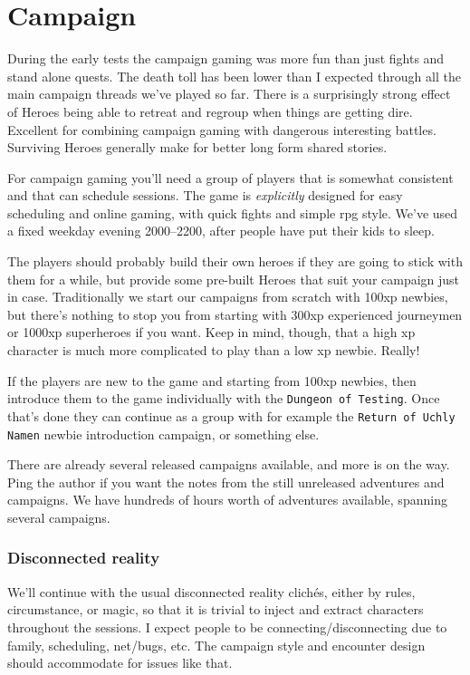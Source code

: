 

\cleardoublepage

\chapter*{Campaign}


During the early tests the campaign gaming was more fun than just fights and stand alone quests. The death toll has been lower than I expected through all the main campaign threads we've played so far. There is a surprisingly strong effect of Heroes being able to retreat and regroup when things are getting dire. Excellent for combining campaign gaming with dangerous interesting battles. Surviving Heroes generally make for better long form shared stories. 

For campaign gaming you'll need a group of players that is somewhat consistent and that can schedule sessions. The game is \emph{explicitly} designed for easy scheduling and online gaming, with quick fights and simple rpg style. We've used a fixed weekday evening 2000--2200, after people have put their kids to sleep.

The players should probably build their own heroes if they are going to stick with them for a while, but provide some pre-built Heroes that suit your campaign just in case. Traditionally we start our campaigns from scratch with 100xp newbies, but there's nothing to stop you from starting with 300xp experienced journeymen or 1000xp superheroes if you want. Keep in mind, though, that a high xp character is much more complicated to play than a low xp newbie. Really!

If the players are new to the game and starting from 100xp newbies, then introduce them to the game individually with the \texttt{Dungeon of Testing}. Once that's done they can continue as a group with for example the \texttt{Return of Uchly Namen} newbie introduction campaign, or something else. 

There are already several released campaigns available, and more is on the way. Ping the author if you want the notes from the still unreleased adventures and campaigns. We have hundreds of hours worth of adventures available, spanning several campaigns.


\subsection*{Disconnected reality}
We'll continue with the usual disconnected reality clichés, either by rules, circumstance, or magic, so that it is trivial to inject and extract characters throughout the sessions. I expect people to be connecting/disconnecting due to family, scheduling, net/bugs, etc. The campaign style and encounter design should accommodate for issues like that.







